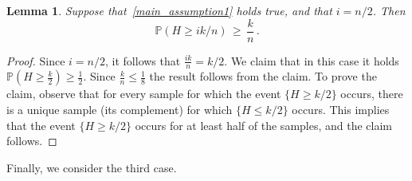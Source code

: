 \documentclass[10pt]{article}
\theoremstyle{plain}
\newtheorem{lemma}[theorem]{Lemma}
\theoremstyle{definition}
\theoremstyle{remark}
\begin{document}
\begin{lemma}\label{third_case}
Suppose that~\eqref{main_assumption1} holds true, and that  $i=n/2$. 
Then   
\[
\mathbb{P}(H \ge ik/n) \, \ge \, \frac{k}{n} \, .
\]
\end{lemma}
\begin{proof}
Since $i=n/2$, it follows that $\frac{ik}{n} =k/2$. 
We claim that in this case it holds $\mathbb{P}(H \ge \frac{k}{2}) \ge \frac{1}{2}$. 
Since $\frac{k}{n}\le \frac{1}{8}$ the result  follows from the claim. 
To prove the claim, observe that for every sample for which the event $\{H\ge k/2\}$ occurs, there is a unique sample (its complement) for which $\{H\le k/2\}$ occurs. This implies that the event $\{H\ge k/2\}$ occurs for at least half of the samples, and the claim follows. 
\end{proof}

Finally, we consider the third case.  
\end{document}

